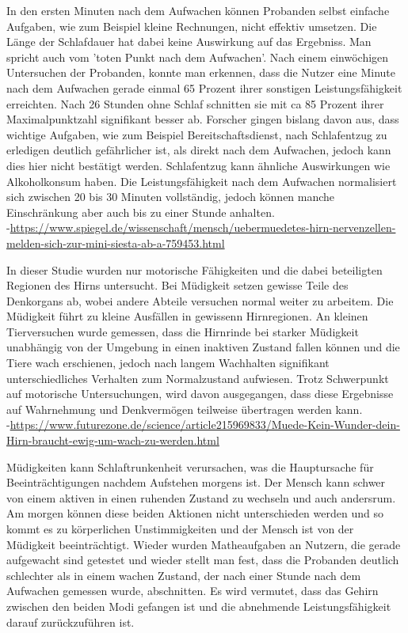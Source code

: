 In den ersten Minuten nach dem Aufwachen können Probanden selbst einfache Aufgaben, wie zum Beispiel kleine Rechnungen, nicht effektiv umsetzen. Die Länge der Schlafdauer hat dabei keine Auswirkung auf das Ergebniss. Man spricht auch vom 'toten Punkt nach dem Aufwachen'. Nach einem einwöchigen Untersuchen der Probanden, konnte man erkennen, dass die Nutzer eine Minute nach dem Aufwachen gerade einmal 65 Prozent ihrer sonstigen Leistungsfähigkeit erreichten. Nach 26 Stunden ohne Schlaf schnitten sie mit ca 85 Prozent ihrer Maximalpunktzahl signifikant besser ab. Forscher gingen bislang davon aus, dass wichtige Aufgaben, wie zum Beispiel Bereitschaftsdienst, nach Schlafentzug zu erledigen deutlich gefährlicher ist, als direkt nach dem Aufwachen, jedoch kann dies hier nicht bestätigt werden.
Schlafentzug kann ähnliche Auswirkungen wie Alkoholkonsum haben.
Die Leistungsfähigkeit nach dem Aufwachen normalisiert sich zwischen 20 bis 30 Minuten vollständig, jedoch können manche Einschränkung aber auch bis zu einer Stunde anhalten. \\

-\url{https://www.spiegel.de/wissenschaft/mensch/uebermuedetes-hirn-nervenzellen-melden-sich-zur-mini-siesta-ab-a-759453.html}

In dieser Studie wurden nur motorische Fähigkeiten und die dabei beteiligten Regionen des Hirns untersucht. Bei Müdigkeit setzen gewisse Teile des Denkorgans ab, wobei andere Abteile versuchen normal weiter zu arbeitem. Die Müdigkeit führt zu kleine Ausfällen in gewissenn Hirnregionen. An kleinen Tierversuchen wurde gemessen, dass die Hirnrinde bei starker Müdigkeit unabhängig von der Umgebung in einen inaktiven Zustand fallen können und die Tiere wach erschienen, jedoch nach langem Wachhalten signifikant unterschiedliches Verhalten zum Normalzustand aufwiesen. Trotz Schwerpunkt auf motorische Untersuchungen, wird davon ausgegangen, dass diese Ergebnisse auf Wahrnehmung und Denkvermögen teilweise übertragen werden kann.\\

-\url{https://www.futurezone.de/science/article215969833/Muede-Kein-Wunder-dein-Hirn-braucht-ewig-um-wach-zu-werden.html}

Müdigkeiten kann Schlaftrunkenheit verursachen, was die Hauptursache für Beeinträchtigungen nachdem Aufstehen morgens ist. Der Mensch kann schwer von einem aktiven in einen ruhenden Zustand zu wechseln und auch andersrum. Am morgen können diese beiden Aktionen nicht unterschieden werden und so kommt es zu körperlichen Unstimmigkeiten und der Mensch ist von der Müdigkeit beeinträchtigt. Wieder wurden Matheaufgaben an Nutzern, die gerade aufgewacht sind getestet und wieder stellt man fest, dass die Probanden deutlich schlechter als in einem wachen Zustand, der nach einer Stunde nach dem Aufwachen gemessen wurde, abschnitten. Es wird vermutet, dass das Gehirn zwischen den beiden Modi gefangen ist und die abnehmende Leistungsfähigkeit darauf zurückzuführen ist.\\


